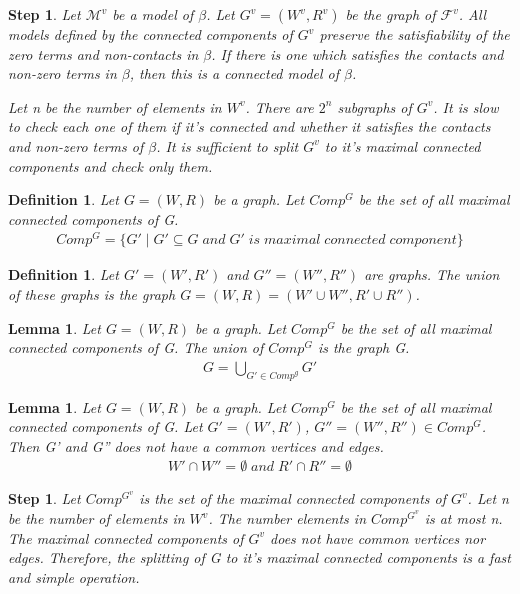 \documentclass{article}
\newcommand\M{\mathcal{M}}
\newcommand\F{\mathcal{F}}
\newtheorem{lemma}[theorem]{Lemma}
\newtheorem{defn}[theorem]{Definition}
\newtheorem{step}[theorem]{Step}
\begin{document}
	\begin{step}
		Let $\M^v$ be a model of $\beta$. Let $G^v=(W^v, R^v)$ be the graph of $\F^v$.
		All models defined by the connected components of $G^v$ preserve the satisfiability of the zero terms and non-contacts in $\beta$. If there is one which satisfies the contacts and non-zero terms in $\beta$, then this is a connected model of $\beta$.

		Let n be the number of elements in $W^v$. There are $2^n$ subgraphs of $G^v$. It is slow to check each one of them if it's connected and whether it satisfies the contacts and non-zero terms of $\beta$. It is sufficient to split $G^v$ to it's maximal connected components and check only them.
	\end{step}

	\begin{defn}
		Let $G=(W, R)$ be a graph. Let $Comp^G$ be the set of all maximal connected components of G.
		\begin{gather*}
			Comp^G = \{ G' \mid G' \subseteq G \; and \; G' \; is \; maximal \; connected \; component\}
		\end{gather*}
	\end{defn}

	\begin{defn}
		Let $G'=(W', R')$ and $G''=(W'', R'')$ are graphs. The union of these graphs is the graph $G=(W,R)=(W' \cup W'', R' \cup R'')$.
	\end{defn}

	\begin{lemma}
		Let $G=(W, R)$ be a graph. Let $Comp^G$ be the set of all maximal connected components of G. The union of $Comp^G$ is the graph G.
		\begin{gather*}
			G = \bigcup\limits_{G' \in Comp^g} G'
		\end{gather*}
	\end{lemma}

	\begin{lemma}
		Let $G=(W, R)$ be a graph. Let $Comp^G$ be the set of all maximal connected components of G. Let $G'=(W', R')$, $G''=(W'', R'') \in Comp^G$. Then G' and G'' does not have a common vertices and edges.
		\begin{gather*}
			 W' \cap W'' = \emptyset \; and \; R' \cap R'' = \emptyset
		\end{gather*}
	\end{lemma}

	\begin{step}
		Let $Comp^{G^v}$ is the set of the maximal connected components of $G^v$. Let n be the number of elements in $W^v$. The number elements in $Comp^{G^v}$ is at most n. The maximal connected components of $G^v$ does not have common vertices nor edges. Therefore, the splitting of G to it's maximal connected components is a fast and simple operation.
	\end{step}
\end{document}
